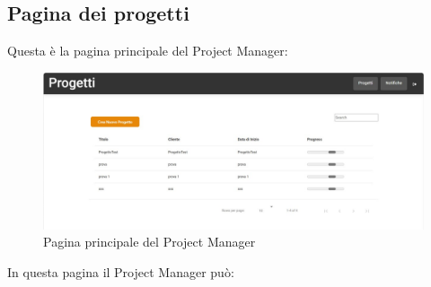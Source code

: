 \documentclass{article}
\begin{document}
\subsection{Pagina dei progetti}
Questa è la pagina principale del Project Manager:
 \begin{figure}[H]
      \centering
      \includegraphics[width=\textwidth]{documenti/Screenshot manuale utente/progetti def.jpeg}
      \caption{Pagina principale del Project Manager}
      \label{pagpm}
    \end{figure} 
In questa pagina il Project Manager può:
\end{document}
